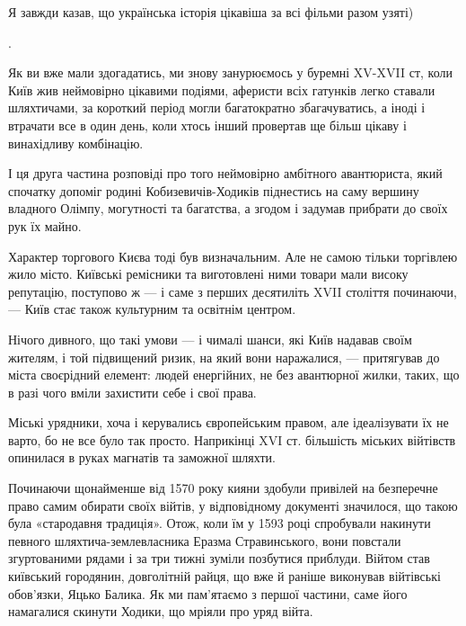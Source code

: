 Я завжди казав, що українська історія цікавіша за всі фільми разом узяті)

.

Як ви вже мали здогадатись, ми знову занурюємось у буремні XV-XVII ст, коли
Київ жив неймовірно цікавими подіями, аферисти всіх гатунків легко ставали
шляхтичами, за короткий період могли багатократно збагачуватись, а іноді і
втрачати все в один день, коли хтось інший провертав ще більш цікаву і
винахідливу комбінацію.


І ця друга частина розповіді про того неймовірно амбітного авантюриста, який
спочатку допоміг родині Кобизевичів-Ходиків піднестись на саму вершину владного
Олімпу, могутності та багатства, а згодом і задумав прибрати до своїх рук їх
майно.

Характер торгового Києва тоді був визначальним. Але не самою тільки торгівлею
жило місто. Київські ремісники та виготовлені ними товари мали високу
репутацію, поступово ж — і саме з перших десятиліть XVII століття починаючи, —
Київ стає також культурним та освітнім центром.


Нічого дивного, що такі умови — і чималі шанси, які Київ надавав своїм жителям,
і той підвищений ризик, на який вони наражалися, — притягував до міста
своєрідний елемент: людей енергійних, не без авантюрної жилки, таких, що в разі
чого вміли захистити себе і свої права. 


Міські урядники, хоча і керувались європейським правом, але ідеалізувати їх не
варто, бо не все було так просто. Наприкінці XVI ст. більшість міських
війтівств опинилася в руках магнатів та заможної шляхти. 


Починаючи щонайменше від 1570 року кияни здобули привілей на безперечне право
самим обирати своїх війтів, у відповідному документі значилося, що такою була
«стародавня традиція». Отож, коли їм у 1593 році спробували накинути певного
шляхтича-землевласника Еразма Стравинського, вони повстали згуртованими рядами
і за три тижні зуміли позбутися приблуди. Війтом став київський городянин,
довголітній райця, що вже й раніше виконував війтівські обов’язки, Яцько
Балика. Як ми пам’ятаємо з першої частини, саме його намагалися скинути Ходики,
що мріяли про уряд війта. 


